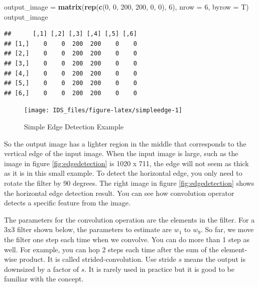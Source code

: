 \documentclass[12pt,]{krantz}
\makeatletter
\newenvironment{Shaded}{\begin{snugshade}}{\end{snugshade}}
\newcommand{\DataTypeTok}[1]{\textcolor[rgb]{0.27,0.27,0.27}{#1}}
\newcommand{\DecValTok}[1]{\textcolor[rgb]{0.06,0.06,0.06}{#1}}
\newcommand{\KeywordTok}[1]{\textcolor[rgb]{0.27,0.27,0.27}{\textbf{#1}}}
\newcommand{\NormalTok}[1]{#1}
\newcommand{\StringTok}[1]{\textcolor[rgb]{0.5,0.5,0.5}{#1}}
\newenvironment{kframe}{%
\medskip{}
\setlength{\fboxsep}{.8em}
 \def\at@end@of@kframe{}%
 \ifinner\ifhmode%
  \def\at@end@of@kframe{\end{minipage}}%
  \begin{minipage}{\columnwidth}%
 \fi\fi%
 \def\FrameCommand##1{\hskip\@totalleftmargin \hskip-\fboxsep
 \colorbox{shadecolor}{##1}\hskip-\fboxsep
     \hskip-\linewidth \hskip-\@totalleftmargin \hskip\columnwidth}%
 \MakeFramed {\advance\hsize-\width
   \@totalleftmargin\z@ \linewidth\hsize
   \@setminipage}}%
 {\par\unskip\endMakeFramed%
 \at@end@of@kframe}
\renewenvironment{Shaded}{\begin{kframe}}{\end{kframe}}
\makeatother
\begin{document}
\begin{Shaded}
\begin{Highlighting}[]
\NormalTok{output_image =}\StringTok{ }\KeywordTok{matrix}\NormalTok{(}\KeywordTok{rep}\NormalTok{(}\KeywordTok{c}\NormalTok{(}\DecValTok{0}\NormalTok{, }\DecValTok{0}\NormalTok{, }\DecValTok{200}\NormalTok{, }\DecValTok{200}\NormalTok{, }\DecValTok{0}\NormalTok{, }\DecValTok{0}\NormalTok{), }\DecValTok{6}\NormalTok{), }
                      \DataTypeTok{nrow =} \DecValTok{6}\NormalTok{, }\DataTypeTok{byrow =}\NormalTok{ T)}
\NormalTok{output_image}
\end{Highlighting}
\end{Shaded}

\begin{verbatim}
##      [,1] [,2] [,3] [,4] [,5] [,6]
## [1,]    0    0  200  200    0    0
## [2,]    0    0  200  200    0    0
## [3,]    0    0  200  200    0    0
## [4,]    0    0  200  200    0    0
## [5,]    0    0  200  200    0    0
## [6,]    0    0  200  200    0    0
\end{verbatim}

\begin{figure}

{\centering \texttt{[image: IDS\_files/figure-latex/simpleedge-1]} 

}

\caption{Simple Edge Detection Example}\label{fig:simpleedge}
\end{figure}

So the output image has a lighter region in the middle that corresponds to the vertical edge of the input image. When the input image is large, such as the image in figure \ref{fig:edgedetection} is 1020 x 711, the edge will not seem as thick as it is in this small example. To detect the horizontal edge, you only need to rotate the filter by 90 degrees. The right image in figure \ref{fig:edgedetection} shows the horizontal edge detection result. You can see how convolution operator detects a specific feature from the image.

The parameters for the convolution operation are the elements in the filter. For a 3x3 filter shown below, the parameters to estimate are \(w_1\) to \(w_9\). So far, we move the filter one step each time when we convolve. You can do more than 1 step as well. For example, you can hop 2 steps each time after the sum of the element-wise product. It is called strided-convolution. Use stride \(s\) means the output is downsized by a factor of \(s\). It is rarely used in practice but it is good to be familiar with the concept.
\end{document}
